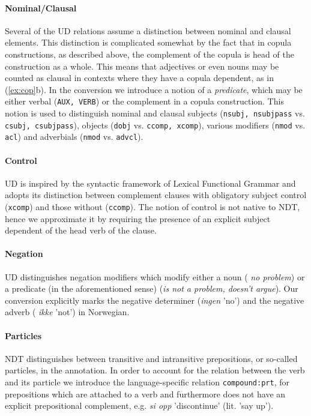\documentclass[11pt,a4paper]{article}
\begin{document}
\paragraph{Nominal/Clausal}Several of the UD relations assume a distinction between nominal and
clausal elements. This distinction is complicated somewhat by the fact
that in copula constructions, as described above, the complement of
the copula is head of the construction as a whole. This means that
adjectives or even nouns may be counted as clausal in contexts where
they have a copula dependent, as in (\ref{ex:cop}b).  In the
conversion we introduce a notion of a \emph{predicate}, which may be
either verbal ({\tt AUX, VERB}) or the complement in a copula
construction. This notion is used to distinguish nominal and clausal
subjects ({\tt nsubj, nsubjpass} vs. {\tt csubj, csubjpass}), objects
({\tt dobj} vs. {\tt ccomp, xcomp}), various modifiers ({\tt nmod}
vs. {\tt acl}) and adverbials ({\tt nmod} vs. {\tt advcl}).

\paragraph{Control}UD is inspired by the syntactic framework of Lexical Functional
Grammar \cite{Kap:Bre:82} and adopts its distinction between complement
clauses with obligatory subject control ({\tt xcomp}) and those without
({\tt ccomp}). The notion of control is not native to NDT, hence we
approximate it by requiring the presence of an explicit subject dependent of the
head verb of the clause.


\paragraph{Negation}UD distinguishes negation modifiers which modify either a noun ({\it
  no problem}) or a predicate (in the aforementioned sense) ({\it is
  not a problem, doesn't argue}). Our conversion explicitly marks the
negative determiner ({\it ingen} 'no') and the negative adverb ({\it
  ikke} 'not') in Norwegian.

\paragraph{Particles}NDT distinguishes between transitive and intransitive prepositions, or
so-called particles, in the annotation. In order to account for the
relation between the verb and its particle we introduce the
language-specific relation {\tt compound:prt}, for prepositions which
are attached to a verb and furthermore does not have an explicit prepositional complement,
e.g. {\it si opp} 'discontinue' (lit. 'say up').  
\end{document}
